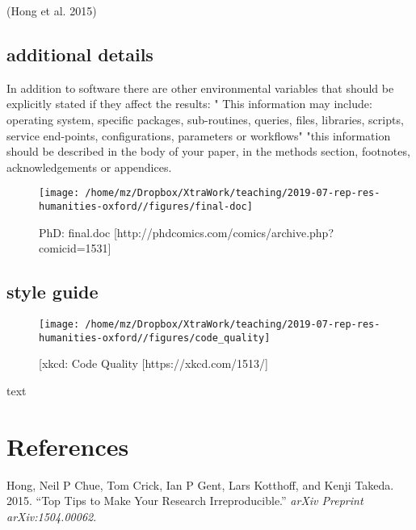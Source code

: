 \documentclass[]{article}
\begin{document}
(Hong et al. 2015)

\hypertarget{additional-details}{%
\subsection{additional details}\label{additional-details}}

In addition to software there are other environmental variables that
should be explicitly stated if they affect the results: " This
information may include: operating system, specific packages,
sub-routines, queries, files, libraries, scripts, service end-points,
configurations, parameters or workflows" "this information should be
described in the body of your paper, in the methods section, footnotes,
acknowledgements or appendices.

\begin{figure}
\texttt{[image: /home/mz/Dropbox/XtraWork/teaching/2019-07-rep-res-humanities-oxford//figures/final-doc]} \caption{PhD: final.doc [http://phdcomics.com/comics/archive.php?comicid=1531]}\label{fig:phd}
\end{figure}

\hypertarget{style-guide}{%
\subsection{style guide}\label{style-guide}}

\begin{figure}
\texttt{[image: /home/mz/Dropbox/XtraWork/teaching/2019-07-rep-res-humanities-oxford//figures/code\_quality]} \caption{[xkcd: Code Quality [https://xkcd.com/1513/]}\label{fig:xkcd}
\end{figure}

text

\hypertarget{references}{%
\section*{References}\label{references}}

\hypertarget{refs}{}
\leavevmode\hypertarget{ref-hong2015top}{}%
Hong, Neil P Chue, Tom Crick, Ian P Gent, Lars Kotthoff, and Kenji
Takeda. 2015. ``Top Tips to Make Your Research Irreproducible.''
\emph{arXiv Preprint arXiv:1504.00062}.
\end{document}
